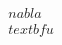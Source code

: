 \documentclass[preview]{standalone}
\begin{document}
\begin{align*}
\quad\\nabla\quad\\textbf{u}
\end{align*}
\end{document}
